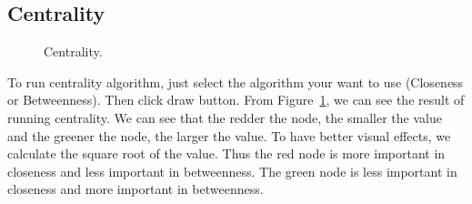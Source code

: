 \documentclass{article}
\begin{document}
\subsection{Centrality}
\begin{figure}[H]
\centering
{}
   \caption{Centrality.}
    \label{fig:centrality}
\end{figure}
To run centrality algorithm, just select the algorithm your want to use (Closeness or Betweenness). Then click draw button. From Figure~\ref{fig:centrality}, we can see the result of running centrality. We can see that the redder the node, the smaller the value and the greener the node, the larger the value. To have better visual effects, we calculate the square root of the value. Thus the red node is more important in closeness and less important in betweenness. The green node is less important in closeness and more important in betweenness.\\ 
\end{document}
